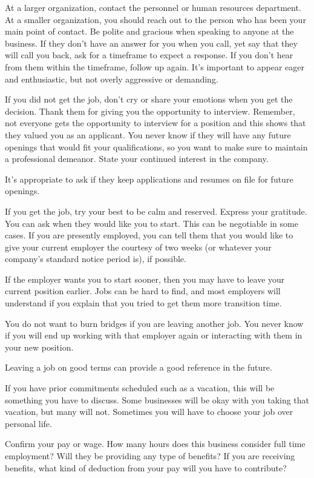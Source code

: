 At a larger organization, contact the personnel or human resources department. At a smaller organization, you should reach out to the person who has been your main point of contact. Be polite and gracious when speaking to anyone at the business. If they don't have an answer for you when you call, yet say that they will call you back, ask for a timeframe to expect a response. If you don't hear from them within the timeframe, follow up again. It's important to appear eager and enthusiastic, but not overly aggressive or demanding.

If you did not get the job, don't cry or share your emotions when you get the decision. Thank them for giving you the opportunity to interview. Remember, not everyone gets the opportunity to interview for a position and this shows that they valued you as an applicant. You never know if they will have any future openings that would fit your qualifications, so you want to make sure to maintain a professional demeanor. State your continued interest in the company.

It's appropriate to ask if they keep applications and resumes on file for future openings.

If you get the job, try your best to be calm and reserved. Express your gratitude. You can ask when they would like you to start. This can be negotiable in some cases. If you are presently employed, you can tell them that you would like to give your current employer the courtesy of two weeks (or whatever your company's standard notice period is), if possible.

If the employer wants you to start sooner, then you may have to leave your current position earlier. Jobs can be hard to find, and most employers will understand if you explain that you tried to get them more transition time.

You do not want to burn bridges if you are leaving another job. You never know if you will end up working with that employer again or interacting with them in your new position.

Leaving a job on good terms can provide a good reference in the future.

If you have prior commitments scheduled such as a vacation, this will be something you have to discuss. Some businesses will be okay with you taking that vacation, but many will not. Sometimes you will have to choose your job over personal life.
 
Confirm your pay or wage. How many hours does this business consider full time employment? Will they be providing any type of benefits? If you are receiving benefits, what kind of deduction from your pay will you have to contribute?

